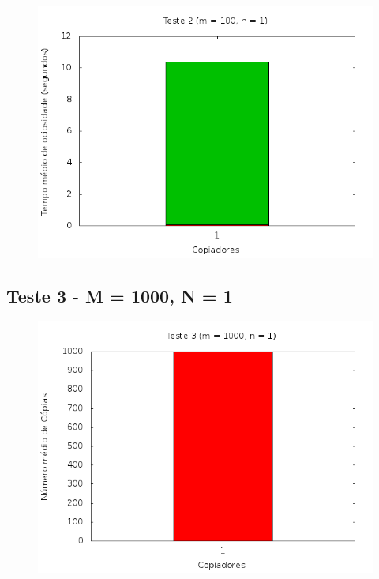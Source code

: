 \documentclass[12pt,a4paper]{article}
\begin{document}
\begin{center}
\begin{figure}[H]
    \center
    \includegraphics[scale=0.5]{imagens/grafico_ociosidade2.png}
    \label{teste2_ociosidade}
\end{figure}
\end{center}

\pagebreak
\subsection{Teste 3 - M = 1000, N = 1}
\begin{center}
\begin{figure}[H]
    \center
    \includegraphics[scale=0.5]{imagens/grafico_copias3.png}
    \label{teste3_copias}
\end{figure}
\end{center}
\end{document}
